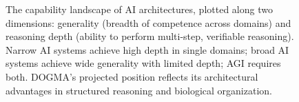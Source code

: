 \begin{figure}[htbp]
\caption{The capability landscape of AI architectures, plotted along two dimensions: generality (breadth of competence across domains) and reasoning depth (ability to perform multi-step, verifiable reasoning). Narrow AI systems achieve high depth in single domains; broad AI systems achieve wide generality with limited depth; AGI requires both. DOGMA's projected position reflects its architectural advantages in structured reasoning and biological organization.}
\label{fig:capability-landscape}
\end{figure}


